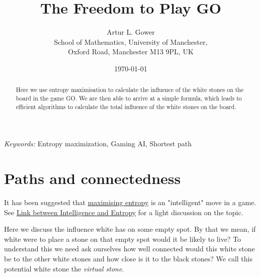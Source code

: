 \documentclass[doublespacing, 12pt, a4paper]{article}
\begin{document}
\title{The Freedom to Play GO }
\author{
 Artur L. Gower\\
\small School of Mathematics, University of Manchester, \\
\small Oxford Road, Manchester M13 9PL, UK
}

\date{\today}
\maketitle

\begin{abstract}
Here we use entropy maximisation to calculate the influence of the white stones on the board in the game GO. We are then able to arrive at a simple formula, which leads to efficient algorithms to calculate the total influence of the white stones on the board.
\end{abstract}

\noindent
{\textit{Keywords:} Entropy maximization, Gaming AI, Shortest path}



\section*{Paths and connectedness}

It has been suggested that \href{https://journals.aps.org/prl/abstract/10.1103/PhysRevLett.110.168702}{maximising entropy} is an "intelligent" move in a game. See \href{https://physics.aps.org/articles/v6/46}{Link between Intelligence and Entropy} for a light discussion on the topic.

Here we discuss the influence white has on some empty spot. By that we mean, if white were to place a stone on that empty spot would it be likely to live? To understand this we need ask ourselves how well connected would this white stone be to the other white stones and how close is it to the black stones?  We call this potential white stone the \emph{virtual stone}.
\end{document}
